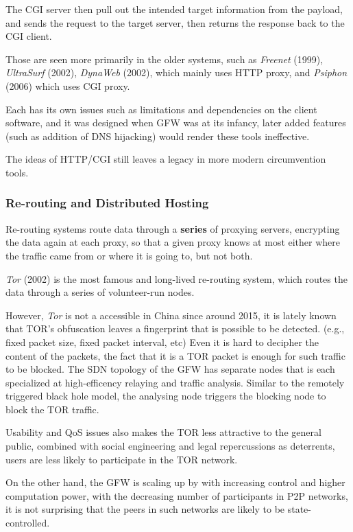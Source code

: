 \documentclass[sigconf]{acmart}
\begin{document}
The CGI server then pull out the intended target information from the
payload, and sends the request to the target server, then returns the
response back to the CGI client.

Those are seen more primarily in the older systems, such as
\emph{Freenet} (1999), \emph{UltraSurf} (2002), \emph{DynaWeb} (2002),
which mainly uses HTTP proxy, and \emph{Psiphon} (2006) which uses CGI
proxy.

Each has its own issues such as limitations and dependencies on the
client software, and it was designed when GFW was at its infancy, later
added features (such as addition of DNS hijacking) would render these
tools ineffective.

The ideas of HTTP/CGI still leaves a legacy in more modern circumvention
tools.

\hypertarget{re-routing-and-distributed-hosting}{%
\subsubsection{Re-routing and Distributed
Hosting}\label{re-routing-and-distributed-hosting}}

Re-routing systems route data through a \textbf{series} of proxying
servers, encrypting the data again at each proxy, so that a given proxy
knows at most either where the traffic came from or where it is going
to, but not both.

\emph{Tor} (2002) is the most famous and long-lived re-routing system,
which routes the data through a series of volunteer-run nodes.

However, \emph{Tor} is not a accessible in China since around 2015, it
is lately known that TOR's obfuscation leaves a fingerprint that is
possible to be detected. (e.g., fixed packet size, fixed packet
interval, etc) Even it is hard to decipher the content of the packets,
the fact that it is a TOR packet is enough for such traffic to be
blocked. \cite{50_tor_finger} The SDN topology of the GFW has separate
nodes that is each specialized at high-efficency relaying and traffic
analysis. Similar to the remotely triggered black hole model, the
analysing node triggers the blocking node to block the TOR traffic.

Usability and QoS issues also makes the TOR less attractive to the
general public, combined with social engineering and legal repercussions
as deterrents, users are less likely to participate in the TOR network.

On the other hand, the GFW is scaling up by with increasing control and
higher computation power, with the decreasing number of participants in
P2P networks, it is not surprising that the peers in such networks are
likely to be state-controlled.
\end{document}
